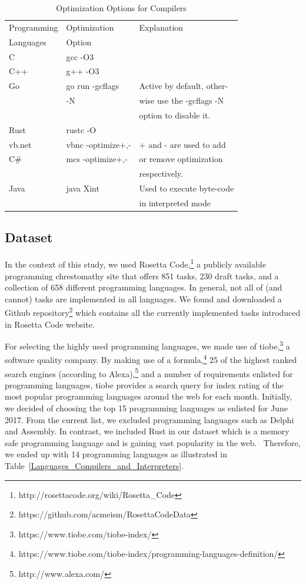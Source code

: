 \begin{table}
		\caption{Optimization Options for Compilers}
		\label{optimization flags}
		\begin{tabular}{lll}
			\toprule
			Programming & Optimization   	& Explanation \\
			Languages  	&  	Option					&\\
			\midrule
			C			& gcc -O3\\
			C++ 		& g++ -O3\\
			Go  		& go run -gcflags  	&Active by default, other-\\
						&	-N				&wise use the -gcflags -N\\
						&					&option to disable it.\\
			Rust		& rustc -O \\
			{\sc vb.net}& vbnc -optimize+,- &+ and - are used to add\\
			C\#			& mcs -optimize+,- 	& or remove optimization\\
						&					& respectively.\\
			Java		& java Xint			&Used to execute byte-code\\	
						&					&in interpreted mode\\	
			\bottomrule
		\end{tabular}
\end{table}


\subsection{Dataset}
In the context of this study, we used Rosetta 
Code,\footnote{http://rosettacode.org/wiki/Rosetta\_Code} a 
publicly available programming chrestomathy site that offers 
851 tasks, 230 draft tasks, and a collection of 658 different 
programming languages. In general, not all of (and cannot) tasks 
are implemented in all languages. 
We found and downloaded a Github repository\footnote{https://github.com/acmeism/RosettaCodeData} 
which contains all the currently implemented tasks introduced in 
Rosetta Code website.

For selecting the highly used programming languages, we made use 
of tiobe,\footnote{https://www.tiobe.com/tiobe-index/} a software 
quality company.
By making use of a formula,\footnote{https://www.tiobe.com/tiobe-index/programming-languages-definition/} 
25 of the highest ranked search engines (according to Alexa),\footnote{http://www.alexa.com/} 
and a number of requirements enlisted for programming languages, 
tiobe provides a search query for index rating of the most popular 
programming languages around the web for each month. 
Initially, we decided of choosing the top 15 programming languages 
as enlisted for June 2017. 
From the current list, we excluded programming languages such as 
Delphi and Assembly. 
In contrast, we included Rust in our dataset which is a memory safe 
programming language and is gaining vast popularity in the web. \
Therefore, we ended up with 14 programming languages as illustrated 
in Table~\ref{Languages_Compilers_and_Interpreters}.

